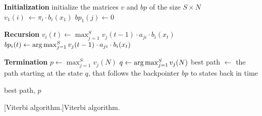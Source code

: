 \begin{algorithm}[ht!]
\begin{algorithmic}[1]

\Statex \textbf{Initialization}
\State initialize the matrices $v$ and $bp$ of the size $S\times N$
	\State $v_1(i)\ \gets \pi_i\cdot b_i(x_1)$
	\State $bp_1(j)\gets 0$
\EndFor

\Statex \textbf{Recursion}
		\State $v_i(t) \gets \max_{j=1}^S v_{j}(t-1)\cdot a_{ji}\cdot b_i(x_t)$
		\State $bp_i(t) \gets \argmax_{j=1}^S v_j(t-1)\cdot a_{ji}\cdot b_i(x_t)$
	\EndFor
\EndFor

\Statex \textbf{Termination}
\State $p \gets \max_{j=1}^S v_j(N)$ 
\State $q \gets \argmax_{j=1}^S v_j(N)$ 
\State best path $\gets$ the path starting at the state $q$, that follows the backpointer $bp$ to states back in time

    \State \Return best path, $p$
\end{algorithmic}
[Viterbi algorithm.]{Viterbi algorithm.}
\end{algorithm}